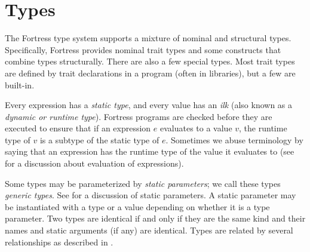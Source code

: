 %
%
%
%

\chapter{Types}






The Fortress type system supports a mixture of nominal and structural types.
Specifically,
Fortress provides nominal trait types
and some constructs that combine types structurally.
There are also a few special types.
Most trait types are defined by trait declarations in a program 
(often in libraries), 
but a few are built-in.

Every expression has a \emph{static type},
and every value has an \emph{ilk}
(also known as a \emph{dynamic or runtime type}).
Fortress programs are checked before they are executed to ensure that if
an expression $e$ evaluates to a value $v$, the runtime type of $v$ is a
subtype of the static type of $e$.
Sometimes we abuse terminology by saying that
an expression has the runtime type of the value it evaluates to
(see  for a discussion about evaluation of expressions).

Some types may be parameterized by \emph{static parameters};
we call these types \emph{generic types}.
See  for a discussion of static parameters.
A static parameter may be instantiated with a type or a value
depending on whether it is a type parameter.
Two types are identical if and only if they are the same kind and
their names and static arguments (if any) are identical.
Types are related by several relationships as described in
.

